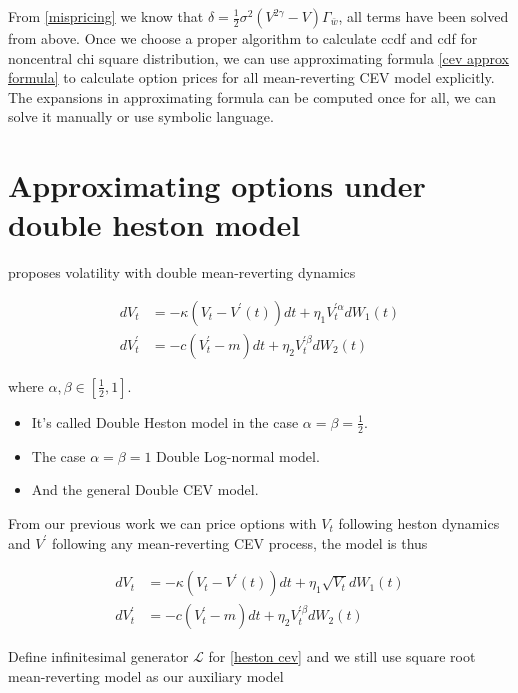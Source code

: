 From \eqref{mispricing} we know that $\delta = \frac{1}{2} \sigma^2 (V^{2\gamma}-V) \Gamma_{\bar{w}}$, all terms have been solved from above. Once we choose a proper algorithm to calculate ccdf and cdf for noncentral chi square distribution,  we can use approximating formula \ref{cev approx formula} to calculate option prices for all mean-reverting CEV model explicitly. The expansions in approximating formula can be computed once for all, we can solve it manually or use symbolic language.

\section{Approximating options under double heston model}

\cite{gatheral_consistent_nodate} proposes volatility with double mean-reverting dynamics

$$
    \begin{aligned}
        d V_t &=-\kappa\left(V_t-V^{\prime}(t)\right) d t+\eta_{1} V^{\prime \alpha}_t  d W_1(t) \\
        d V^{\prime}_t &=-c\left(V^{\prime}_t-m\right) d t+\eta_{2} V^{\prime \beta}_t d W_{2}(t)
    \end{aligned}
$$

\noindent where $\alpha, \beta \in [\frac{1}{2},1]$.

\begin{itemize}
    \item It's called Double Heston model in the case $\alpha=\beta=\frac{1}{2}$.
    \item The case $\alpha=\beta=1$ Double Log-normal model.
    \item And the general Double CEV model.
\end{itemize}

From our previous work we can price options with $V_t$ following heston dynamics and $V^{\prime}$ following any mean-reverting CEV process, the model is thus

\begin{equation}\label{heston cev}
    \begin{aligned}
        d V_t &=-\kappa\left(V_t-V^{\prime}(t)\right) d t+\eta_{1} \sqrt{V_t} d W_1(t) \\
        d V^{\prime}_t &=-c\left(V^{\prime}_t-m\right) d t+\eta_{2} V^{\prime \beta}_t d W_{2}(t)
    \end{aligned}
\end{equation}

Define infinitesimal generator $\mathcal{L}$ for \eqref{heston cev} and we still use square root mean-reverting model as our auxiliary model

